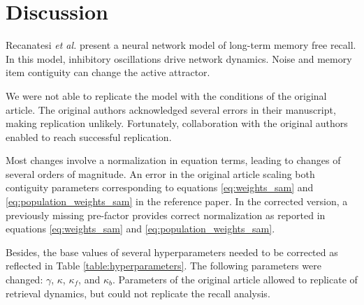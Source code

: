\section{Discussion}

Recanatesi \textit{et al.} \parencite{recanatesi2015} present a neural network model of long-term memory free recall.
In this model, inhibitory oscillations drive network dynamics.
Noise and memory item contiguity can change the active attractor.

We were not able to replicate the model with the conditions of the original article.
The original authors acknowledged several errors in their manuscript, making replication unlikely.
Fortunately, collaboration with the original authors enabled to reach successful replication.

Most changes involve a normalization in equation terms, leading to changes of several orders of magnitude.
An error in the original article scaling both contiguity parameters corresponding to equations \ref{eq:weights_sam} and \ref{eq:population_weights_sam} in the reference paper.
In the corrected version, a previously missing pre-factor provides correct normalization as reported in equations \ref{eq:weights_sam} and \ref{eq:population_weights_sam}.

Besides, the base values of several hyperparameters needed to be corrected as reflected in Table \ref{table:hyperparameters}.
The following parameters were changed:
\(\gamma\), \(\kappa\), \(\kappa_{f}\), and \(\kappa_{b}\).
Parameters of the original article allowed to replicate of retrieval dynamics, but could not replicate the recall analysis.




